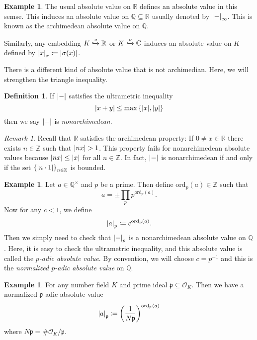 \documentclass[leqno, openany]{memoir}
\theoremstyle{definition}
\newtheorem{defn}[thm]{Definition}
\newtheorem{exm}[thm]{Example}
\theoremstyle{remark}
\newtheorem{rmk}[thm]{Remark}
\theoremstyle{plain}
\theoremstyle{definition}
\theoremstyle{remark}
\newcommand{\R}{\mathbb{R}}
\newcommand{\C}{\mathbb{C}}
\newcommand{\Z}{\mathbb{Z}}
\newcommand{\Q}{\mathbb{Q}}
\newcommand{\mc}[1]{\mathcal{#1}}
\newcommand{\mf}[1]{\mathfrak{#1}}
\newcommand{\mr}[1]{\mathrm{#1}}
\begin{document}
\begin{exm} The usual absolute value on $\R$ defines an absolute value in this
    semse. This induces an absolute value on $\Q \subseteq \R$ usually denoted
    by $\abs{-}_{\infty}$. This is known as the archimedean absolute value on
    $\Q$.

    Similarly, any embedding $K \xhookrightarrow{\sigma} \R$ or $K
\xhookrightarrow{\sigma} \C$ induces an absolute value on $K$ defined by
$\abs{x}_{\sigma} \coloneqq \abs{\sigma(x)}$.  \end{exm}

There is a different kind of absolute value that is not archimedian. Here, we
will strengthen the triangle inequality.

\begin{defn} If $\abs{-}$ satisfies the ultrametric inequality \[ \abs{x+y}
\leq \max \qty{\abs{x}, \abs{y}} \] then we say $\abs{-}$ is
\textit{nonarchimedean}.  \end{defn}

\begin{rmk} Recall that $\R$ satisfies the archimedean property: If $0 \neq x
    \in \R$ there exists $n \in \Z$ such that $\abs{nx} > 1$. This property
    fails for nonarchimedean absolute values because $\abs{nx} \leq \abs{x}$
    for all $n \in \Z$. In fact, $\abs{-}$ is nonarchimedean if and only if the
    set $\qty{\abs{n \cdot 1}}_{n \in \Z}$ is bounded.  \end{rmk}

\begin{exm} Let $a \in \Q^{\times}$ and $p$ be a prime. Then define
    $\mr{ord}_p(a) \in \Z$ such that \[ a = \pm \prod_{p} p^{\mr{ord}_p(a)}. \]
    Now for any $c < 1$, we define \[ \abs{a}_p \coloneqq c^{\mr{ord}_p(a)}. \]
    Then we simply need to check that $\abs{-}_p$ is a nonarchimedean absolute
    value on $\Q$. Here, it is easy to check the ultrametric inequality, and
    this absolute value is called the \textit{$p$-adic absolute value}. By
    convention, we will choose $c = p^{-1}$ and this is the \textit{normalized
    $p$-adic absolute value} on $\Q$.  \end{exm}

\begin{exm} For any number field $K$ and prime ideal $\mf{p} \subseteq
    \mc{O}_K$. Then we have a normalized $\mf{p}$-adic absolute value \[
    \abs{a}_{\mf{p}} \coloneqq \qty(\frac{1}{N\mf{p}})^{\mr{ord}_{\mf{p}}(a)}
\] where $N\mf{p} = \# \mc{O}_K / \mf{p}$.  \end{exm}
\end{document}
